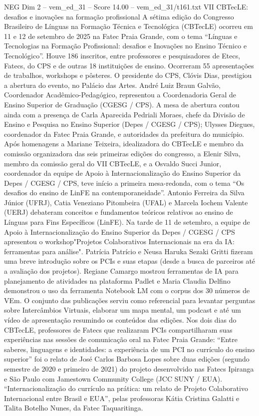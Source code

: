 \begin{textsample}{NEG Dim 2 – vem\_ed\_31 – Score 14.00 – vem\_ed\_31/t161.txt}  \label{ex:f2_neg_177}
VII CBTecLE: desafios e inovações na formação profissional A sétima edição do Congresso Brasileiro de Línguas na Formação Técnica e Tecnológica (CBTecLE) ocorreu em 11 e 12 de setembro de 2025 na Fatec Praia Grande, com o tema “Línguas e Tecnologias na Formação Profissional: desafios e Inovações no Ensino Técnico e Tecnológico”.
Houve 186 inscritos, entre professores e pesquisadores de Etecs, Fatecs, do CPS e de outras 18 instituições de ensino.
Ocorreram 55 apresentações de trabalhos, workshops e pôsteres.
O presidente do CPS, Clóvis Dias, prestigiou a abertura do evento, no Palácio das Artes.
André Luiz Braun Galvão, Coordenador Acadêmico-Pedagógico, representou a Coordenadoria Geral de Ensino Superior de Graduação (CGESG / CPS).
A mesa de abertura contou ainda com a presença de Carla Aparecida Pedriali Moraes, chefe da Divisão de Ensino e Pesquisa no Ensino Superior (Depes / CGESG / CPS); Ulysses Diegues, coordenador da Fatec Praia Grande, e autoridades da prefeitura do município.
Após homenagens a Mariane Teixeira, idealizadora do CBTecLE e membro da comissão organizadora das seis primeiras edições do congresso, a Elenir Silva, membro da comissão geral do VII CBTecLE, e a Osvaldo Succi Junior, coordenador da equipe de Apoio à Internacionalização do Ensino Superior da Depes / CGESG / CPS, teve início a primeira mesa-redonda, com o tema “Os desafios do ensino de LinFE na contemporaneidade”.
Antonio Ferreira da Silva Júnior (UFRJ), Catia Veneziano Pitombeira (UFAL) e Marcela Iochem Valente (UERJ) debateram conceitos e fundamentos teóricos relativos ao ensino de Línguas para Fins Específicos (LinFE).
Na tarde de 11 de setembro, a equipe de Apoio à Internacionalização do Ensino Superior da Depes / CGESG / CPS apresentou o workshop"Projetos Colaborativos Internacionais na era da IA: ferramentas para análise".
Patrícia Patrício e Neusa Haruka Sezaki Gritti fizeram uma breve introdução sobre os PCIs e suas etapas (desde a busca de parceiros até a avaliação dos projetos).
Regiane Camargo mostrou ferramentas de IA para planejamento de atividades na plataforma Padlet e Maria Claudia Delfino demonstrou o uso da ferramenta Notebook LM com o corpus dos 30 números de VEm.
O conjunto das publicações serviu como referencial para levantar perguntas sobre Intercâmbios Virtuais, elaborar um mapa mental, um podcast e até um vídeo de apresentação resumindo os conteúdos das edições.
Nos dois dias do CBTecLE, professores de Fatecs que realizaram PCIs compartilharam suas experiências nas sessões de comunicação oral na Fatec Praia Grande: “Entre saberes, linguagens e identidades: a experiência de um PCI no currículo do ensino superior” foi o relato de José Carlos Barbosa Lopes sobre duas edições (segundo semestre de 2020 e primeiro de 2021) do projeto desenvolvido nas Fatecs Ipiranga e São Paulo com Jamestown Community College (JCC SUNY / EUA). “Internacionalização do currículo na prática: um relato de Projeto Colaborativo Internacional entre Brasil e EUA”, pelas professoras Kátia Cristina Galatti e Talita Botelho Nunes, da Fatec Taquaritinga.

\end{textsample}
